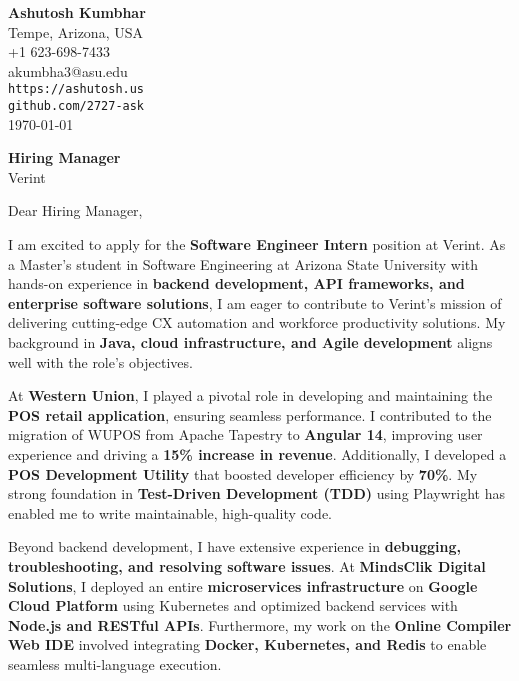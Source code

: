 \documentclass[11pt]{article}
\begin{document}
\begin{flushleft}
\textbf{Ashutosh Kumbhar} \\
Tempe, Arizona, USA \\
+1 623-698-7433 \\
akumbha3@asu.edu \\
\texttt{https://ashutosh.us} \\
\texttt{github.com/2727-ask} \\
\today
\end{flushleft}

\vspace{0.5em}

\textbf{Hiring Manager} \\
Verint \\

\vspace{1em}

Dear Hiring Manager,

I am excited to apply for the \textbf{Software Engineer Intern} position at Verint. As a Master's student in Software Engineering at Arizona State University with hands-on experience in \textbf{backend development, API frameworks, and enterprise software solutions}, I am eager to contribute to Verint’s mission of delivering cutting-edge CX automation and workforce productivity solutions. My background in \textbf{Java, cloud infrastructure, and Agile development} aligns well with the role's objectives.

At \textbf{Western Union}, I played a pivotal role in developing and maintaining the \textbf{POS retail application}, ensuring seamless performance. I contributed to the migration of WUPOS from Apache Tapestry to \textbf{Angular 14}, improving user experience and driving a \textbf{15\% increase in revenue}. Additionally, I developed a \textbf{POS Development Utility} that boosted developer efficiency by \textbf{70\%}. My strong foundation in \textbf{Test-Driven Development (TDD)} using Playwright has enabled me to write maintainable, high-quality code.

Beyond backend development, I have extensive experience in \textbf{debugging, troubleshooting, and resolving software issues}. At \textbf{MindsClik Digital Solutions}, I deployed an entire \textbf{microservices infrastructure} on \textbf{Google Cloud Platform} using Kubernetes and optimized backend services with \textbf{Node.js and RESTful APIs}. Furthermore, my work on the \textbf{Online Compiler Web IDE} involved integrating \textbf{Docker, Kubernetes, and Redis} to enable seamless multi-language execution.
\end{document}
